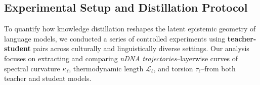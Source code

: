 \subsection{Experimental Setup and Distillation Protocol}

\vspace{0.5em}
\noindent To quantify how knowledge distillation reshapes the latent epistemic geometry of language models, we conducted a series of controlled experiments using \textbf{teacher-student} pairs across culturally and linguistically diverse settings. Our analysis focuses on extracting and comparing \emph{nDNA trajectories}--layerwise curves of spectral curvature $\kappa_\ell$, thermodynamic length $\mathcal{L}_\ell$, and torsion $\tau_\ell$--from both teacher and student models.

